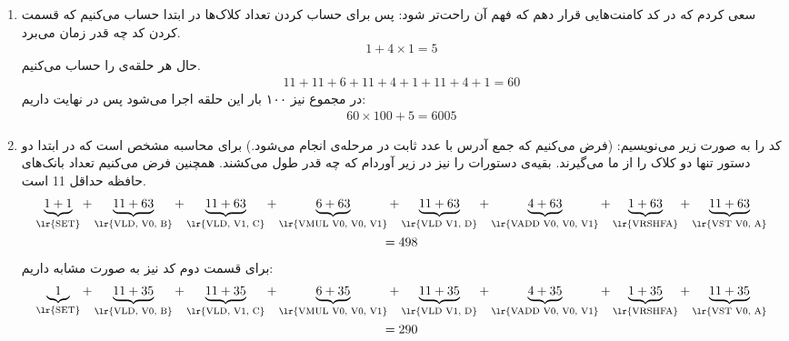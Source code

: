 \section{}
\begin{enumerate}
    \item سعی کردم که در کد کامنت‌هایی قرار دهم که فهم آن راحت‌تر شود:
    پس برای حساب کردن تعداد کلاک‌ها در ابتدا حساب می‌کنیم که قسمت
    کردن کد چه قدر زمان می‌برد.
    \begin{gather*}
        1 + 4 \times 1 = 5
    \end{gather*}
    حال هر حلقه‌ی
    را حساب می‌کنیم.
    \begin{gather*}
        11 + 11 + 6 + 11 + 4 + 1 + 11 + 4 + 1 = 60
    \end{gather*}
    در مجموع نیز ۱۰۰ بار این حلقه اجرا می‌شود پس در نهایت داریم:
    \begin{gather*}
        60 \times 100 + 5 = 6005
    \end{gather*}
    \item کد را به صورت زیر می‌نویسیم: (فرض می‌کنیم که جمع آدرس با عدد ثابت در مرحله‌ی  انجام می‌شود.)
    برای محاسبه مشخص است که در ابتدا دو دستور  تنها دو کلاک را از ما می‌گیرند.
    بقیه‌ی دستورات را نیز در زیر آوردام که چه قدر طول می‌کشند.
    همچنین فرض می‌کنیم تعداد بانک‌های حافظه حداقل 11 است.
    \begin{gather*}
        \underbrace{1 + 1}_{\text{\lr{SET}}} + \underbrace{11 + 63}_{\text{\lr{VLD, V0, B}}} + \underbrace{11 + 63}_{\text{\lr{VLD, V1, C}}} + \underbrace{6 + 63}_{\text{\lr{VMUL V0, V0, V1}}} + \underbrace{11 + 63}_{\text{\lr{VLD V1, D}}} + \underbrace{4 + 63}_{\text{\lr{VADD V0, V0, V1}}} + \underbrace{1 + 63}_{\text{\lr{VRSHFA}}} + \underbrace{11 + 63}_{\text{\lr{VST V0, A}}} \\
        = 498
    \end{gather*}
    برای قسمت دوم کد نیز به صورت مشابه داریم:
    \begin{gather*}
        \underbrace{1}_{\text{\lr{SET}}} + \underbrace{11 + 35}_{\text{\lr{VLD, V0, B}}} + \underbrace{11 + 35}_{\text{\lr{VLD, V1, C}}} + \underbrace{6 + 35}_{\text{\lr{VMUL V0, V0, V1}}} + \underbrace{11 + 35}_{\text{\lr{VLD V1, D}}} + \underbrace{4 + 35}_{\text{\lr{VADD V0, V0, V1}}} + \underbrace{1 + 35}_{\text{\lr{VRSHFA}}} + \underbrace{11 + 35}_{\text{\lr{VST V0, A}}} \\
        = 290
    \end{gather*}

\end{enumerate}

